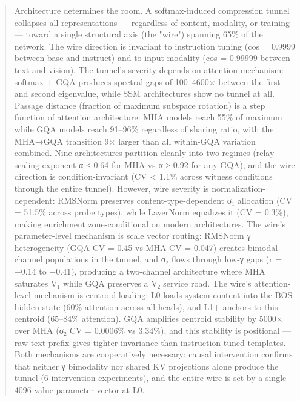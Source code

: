 \documentclass[12pt]{article}
\begin{document}
\begin{abstract}
Architecture determines the room. A softmax-induced compression tunnel collapses all representations — regardless of content, modality, or training — toward a single structural axis (the "wire") spanning 65\% of the network. The wire direction is invariant to instruction tuning (cos = 0.9999 between base and instruct) and to input modality (cos = 0.99999 between text and vision). The tunnel's severity depends on attention mechanism: softmax + GQA produces spectral gaps of 100–4600× between the first and second eigenvalue, while SSM architectures show no tunnel at all. Passage distance (fraction of maximum subspace rotation) is a step function of attention architecture: MHA models reach 55\% of maximum while GQA models reach 91–96\% regardless of sharing ratio, with the MHA→GQA transition 9× larger than all within-GQA variation combined. Nine architectures partition cleanly into two regimes (relay scaling exponent α ≤ 0.64 for MHA vs α ≥ 0.92 for any GQA), and the wire direction is condition-invariant (CV < 1.1\% across witness conditions through the entire tunnel). However, wire severity is normalization-dependent: RMSNorm preserves content-type-dependent σ₁ allocation (CV = 51.5\% across probe types), while LayerNorm equalizes it (CV = 0.3\%), making enrichment zone-conditional on modern architectures. The wire's parameter-level mechanism is scale vector routing: RMSNorm γ heterogeneity (GQA CV = 0.45 vs MHA CV = 0.047) creates bimodal channel populations in the tunnel, and σ₂ flows through low-γ gaps (r = −0.14 to −0.41), producing a two-channel architecture where MHA saturates V₁ while GQA preserves a V₂ service road. The wire's attention-level mechanism is centroid loading: L0 loads system content into the BOS hidden state (60\% attention across all heads), and L1+ anchors to this centroid (65–84\% attention). GQA amplifies centroid stability by 5000× over MHA (σ₂ CV = 0.0006\% vs 3.34\%), and this stability is positional — raw text prefix gives tighter invariance than instruction-tuned templates. Both mechanisms are cooperatively necessary: causal intervention confirms that neither γ bimodality nor shared KV projections alone produce the tunnel (6 intervention experiments), and the entire wire is set by a single 4096-value parameter vector at L0.


\end{abstract}
\end{document}
